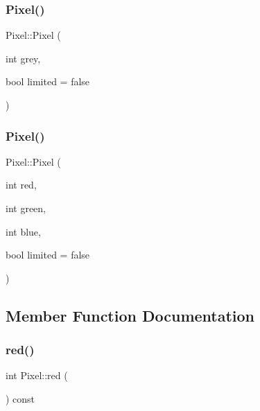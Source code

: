 \mbox{\label{class_pixel_a3657c5d595b9eb8d2aab7d5cd4f0c200}} 
\subsubsection{\texorpdfstring{Pixel()}{Pixel()}\hspace{0.1cm}{\footnotesize\ttfamily [2/3]}}
{\footnotesize\ttfamily Pixel\+::\+Pixel (\begin{DoxyParamCaption}\item[{int}]{grey,  }\item[{bool}]{limited = {\ttfamily false} }\end{DoxyParamCaption})}

\mbox{\label{class_pixel_ae3cc04f5e89adc67faf1af864338e537}} 
\subsubsection{\texorpdfstring{Pixel()}{Pixel()}\hspace{0.1cm}{\footnotesize\ttfamily [3/3]}}
{\footnotesize\ttfamily Pixel\+::\+Pixel (\begin{DoxyParamCaption}\item[{int}]{red,  }\item[{int}]{green,  }\item[{int}]{blue,  }\item[{bool}]{limited = {\ttfamily false} }\end{DoxyParamCaption})}



\subsection{Member Function Documentation}
\mbox{\label{class_pixel_a29d67107325086ef34118afb5dcf440a}} 
\subsubsection{\texorpdfstring{red()}{red()}}
{\footnotesize\ttfamily int Pixel\+::red (\begin{DoxyParamCaption}{ }\end{DoxyParamCaption}) const}

